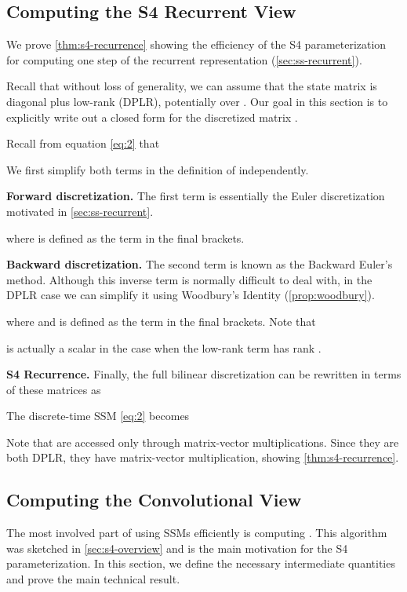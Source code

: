 \documentclass{article}
\newcommand{\methodabbrv}{S4}
\begin{document}
\subsection{Computing the \methodabbrv{} Recurrent View}
\label{sec:s4-recurrence-proof}

We prove \cref{thm:s4-recurrence} showing the efficiency of the \methodabbrv{} parameterization for computing one step of the recurrent representation (\cref{sec:ss-recurrent}).

Recall that without loss of generality, we can assume that the state matrix  is diagonal plus low-rank (DPLR), potentially over .
Our goal in this section is to explicitly write out a closed form for the discretized matrix .

Recall from equation \eqref{eq:2} that




We first simplify both terms in the definition of  independently.

\textbf{Forward discretization.}
The first term is essentially the Euler discretization motivated in \cref{sec:ss-recurrent}.

where  is defined as the term in the final brackets.

\textbf{Backward discretization.}
The second term is known as the Backward Euler's method.
Although this inverse term is normally difficult to deal with,
in the DPLR case we can simplify it using Woodbury's Identity (\cref{prop:woodbury}).

where 
and  is defined as the term in the final brackets.
Note that

is actually a scalar in the case when the low-rank term has rank .


\textbf{\methodabbrv{} Recurrence.}
Finally, the full bilinear discretization can be rewritten in terms of these matrices as

The discrete-time SSM \eqref{eq:2} becomes

Note that  are accessed only through matrix-vector multiplications.
Since they are both DPLR, they have  matrix-vector multiplication,
showing \cref{thm:s4-recurrence}.


\subsection{Computing the Convolutional View}
\label{sec:s4-convolution-proof}

The most involved part of using SSMs efficiently is computing .
This algorithm was sketched in \cref{sec:s4-overview} and is the main motivation for the \methodabbrv{} parameterization.
In this section, we define the necessary intermediate quantities and prove the main technical result. 
\end{document}
